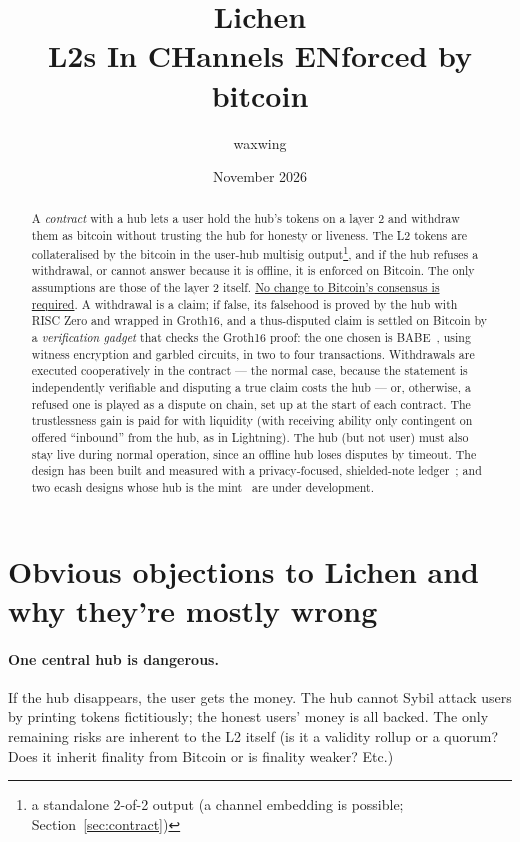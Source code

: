 \documentclass[11pt]{article}
\title{\textbf{Lichen}\\L2s In CHannels ENforced by bitcoin}
\author{waxwing}
\date{November 2026}
\begin{document}
\maketitle

\begin{abstract}
A \emph{contract} with a hub lets a user hold the hub's tokens on a layer 2 and
withdraw them as bitcoin without trusting the hub for honesty or liveness. The L2 tokens are collateralised by the bitcoin in the user-hub multisig output\footnote{a standalone 2-of-2 output (a channel embedding is possible; Section~\ref{sec:contract})}, and if the hub refuses a withdrawal, or cannot answer because it is offline, it is enforced on Bitcoin. The only assumptions are those of the layer 2 itself. \underline{No change to Bitcoin's
consensus is required}. A withdrawal is a claim; if false, its falsehood is proved by the hub with RISC Zero and wrapped in Groth16, and a thus-disputed claim is settled on Bitcoin by a \emph{verification gadget} that checks the Groth16 proof: the one chosen is BABE~\cite{babe}, using witness encryption and garbled circuits, in two to four transactions.  Withdrawals are executed cooperatively in the contract --- the normal case, because the statement is independently verifiable and disputing a true claim costs the hub --- or, otherwise, a refused one is played as a dispute on chain, set up at the start of each contract. The trustlessness gain is paid for with liquidity (with receiving ability only contingent on offered ``inbound'' from the hub, as in Lightning). The hub (but not user) must also stay live during normal operation, since an offline hub loses disputes by timeout. The design has been built and measured with a privacy-focused, shielded-note ledger~\cite{vlichencode,lichenl2}; and two ecash designs whose hub is the mint~\cite{lichenecash,glichen} are under development.
\end{abstract}

\tableofcontents


\section{Obvious objections to Lichen and why they're mostly wrong}
\label{sec:intro}

\paragraph{One central hub is dangerous.} If the hub disappears, the user gets the money. The hub cannot Sybil attack users by printing tokens fictitiously; the honest users' money is all backed. The only remaining risks are inherent to the L2 itself (is it a validity rollup or a quorum? Does it inherit finality from Bitcoin or is finality weaker? Etc.)
\end{document}
